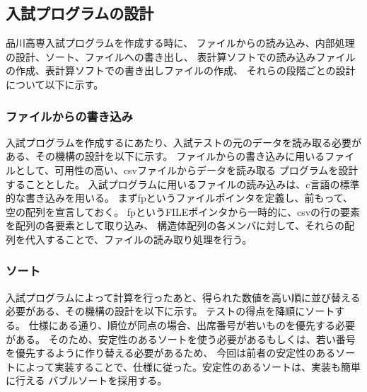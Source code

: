 \documentclass{jsarticle}
\begin{document}
\newpage
\subsection{入試プログラムの設計}\label{s4_2}
品川高専入試プログラムを作成する時に、
ファイルからの読み込み、内部処理の設計、ソート、ファイルへの書き出し、
表計算ソフトでの読み込みファイルの作成、表計算ソフトでの書き出しファイルの作成、
それらの段階ごとの設計について以下に示す。

\subsubsection{ファイルからの書き込み}
入試プログラムを作成するにあたり、入試テストの元のデータを読み取る必要がある、その機構の設計を以下に示す。
ファイルからの書き込みに用いるファイルとして、可用性の高い、csvファイルからデータを読み取る
プログラムを設計することとした。
入試プログラムに用いるファイルの読み込みは、c言語の標準的な書き込みを用いる。
まずfpというファイルポインタを定義し、前もって、空の配列を宣言しておく。
fpというFILEポインタから一時的に、csvの行の要素を配列の各要素として取り込み、
構造体配列の各メンバに対して、それらの配列を代入することで、ファイルの読み取り処理を行う。

\subsubsection{ソート}
入試プログラムによって計算を行ったあと、得られた数値を高い順に並び替える必要がある、その機構の設計を以下に示す。
テストの得点を降順にソートする。
仕様にある通り、順位が同点の場合、出席番号が若いものを優先する必要がある。
そのため、安定性のあるソートを使う必要があるもしくは、若い番号を優先するように作り替える必要があるため、
今回は前者の安定性のあるソートによって実装することで、仕様に従った。安定性のあるソートは、実装も簡単に行える
バブルソートを採用する。
\end{document}
